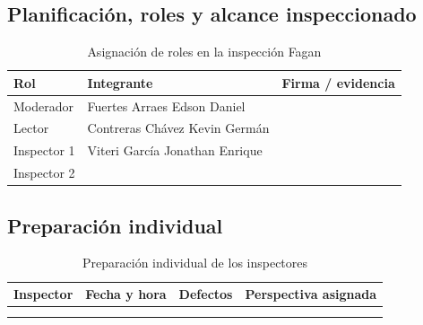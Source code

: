 \documentclass[journal,onecolumn]{IEEEtran}
\newcommand{\guia}[2]{%
	\begin{mdframed}[style=guia]
		\sloppy
		\noindent\textbf{Responsable: #1}\\[2pt]
		#2
	\end{mdframed}
}
\newif\ifguias
\let\guiaoriginal\guia
\renewcommand{\guia}[2]{\ifguias\guiaoriginal{#1}{#2}\fi}
\begin{document}
	\subsection{Planificación, roles y alcance inspeccionado}
	
	\begin{table}[H]
		\centering
		\caption{Asignación de roles en la inspección Fagan}
		\begin{tabular}{L{3.5cm} L{5.5cm} L{3.5cm}}
			\toprule
			\textbf{Rol} & \textbf{Integrante} & \textbf{Firma / evidencia} \\
			\midrule
			Moderador   & Fuertes Arraes Edson Daniel      & \\
			Lector      & Contreras Chávez Kevin Germán    & \\
			Inspector 1 & Viteri García Jonathan Enrique   & \\
			Inspector 2 &                                  & \\
			\bottomrule
		\end{tabular}
	\end{table}
	
	\guia{Edson (Integrante 1)}{%
		\textbf{Punto crítico a resolver antes de la sesión:} el criterio de admisión~A3 exige los
		cuatro roles asignados a \textbf{personas distintas} y el equipo es de tres. Consultar al
		docente. Salida habitual: Edson asume Moderador e Inspector~2 en fases distintas, con la
		rotación declarada explícitamente en el acta; alternativa, solicitar autorización para tres
		roles. \textbf{Dejar la respuesta del docente por escrito} en el Anexo~F.\\[3pt]
		Redactar además el alcance inspeccionado. Recomendación para MundiPets: inspeccionar la
		\textbf{Sección 3 del ERS} (Requisitos específicos), que concentra los 25~RF, los 16~RNF y
		las 9~RD --- es donde viven los enunciados inspeccionables. Contar las páginas efectivas de
		ese tramo: ese es el denominador de la densidad de defectos de la sección 4.5. No usar el
		total del ERS como denominador si solo se inspeccionó una parte.}
	
	\subsection{Preparación individual}
	
	\begin{table}[H]
		\centering
		\caption{Preparación individual de los inspectores}
		\begin{tabular}{L{4.5cm} L{3.5cm} C{2.5cm} L{3.0cm}}
			\toprule
			\textbf{Inspector} & \textbf{Fecha y hora} & \textbf{Defectos} &
			\textbf{Perspectiva asignada} \\
			\midrule
			& & & \\
			& & & \\
			\bottomrule
		\end{tabular}
	\end{table}
	
\end{document}
